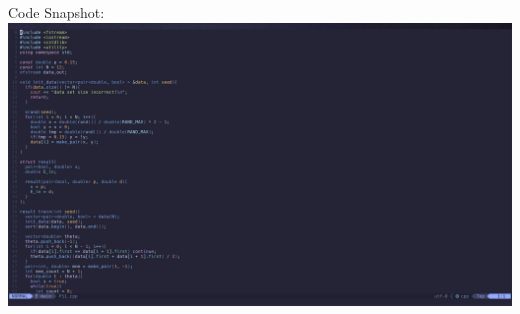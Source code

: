 \documentclass[11pt]{article}
\theoremstyle{definition}
\begin{document}
Code Snapshot: \\ 
\includegraphics[width =\textwidth]{P12code.png}
\end{document}
